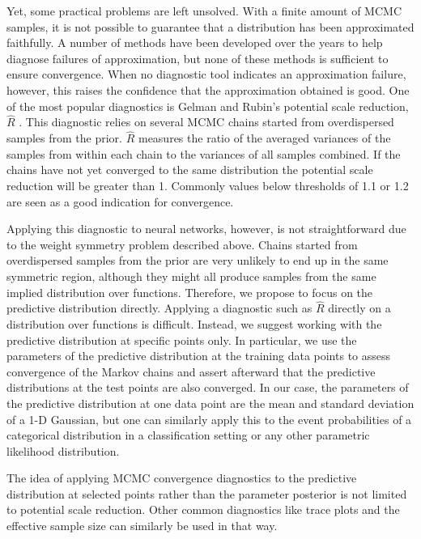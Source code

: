 \documentclass[../thesis.tex]{subfiles}
\begin{document}
Yet, some practical problems are left unsolved. With a finite amount of MCMC samples, it is not possible to guarantee that a distribution has been approximated faithfully. A number of methods have been developed over the years to help diagnose failures of approximation, but none of these methods is sufficient to ensure convergence. When no diagnostic tool indicates an approximation failure, however, this raises the confidence that the approximation obtained is good. One of the most popular diagnostics is Gelman and Rubin's potential scale reduction, $\hat{R}$ \parencite{gelman1992inference}. This diagnostic relies on several MCMC chains started from overdispersed samples from the prior. $\hat{R}$ measures the ratio of the averaged variances of the samples from within each chain to the variances of all samples combined. If the chains have not yet converged to the same distribution the potential scale reduction will be greater than 1. Commonly values below thresholds of 1.1 or 1.2 are seen as a good indication for convergence.

Applying this diagnostic to neural networks, however, is not straightforward due to the weight symmetry problem described above. Chains started from overdispersed samples from the prior are very unlikely to end up in the same symmetric region, although they might all produce samples from the same implied distribution over functions. Therefore, we propose to focus on the predictive distribution directly. Applying a diagnostic such as $\hat{R}$ directly on a distribution over functions is difficult. Instead, we suggest working with the predictive distribution at specific points only. In particular, we use the parameters of the predictive distribution at the training data points to assess convergence of the Markov chains and assert afterward that the predictive distributions at the test points are also converged. In our case, the parameters of the predictive distribution at one data point are the mean and standard deviation of a 1-D Gaussian, but one can similarly apply this to the event probabilities of a categorical distribution in a classification setting or any other parametric likelihood distribution.

The idea of applying MCMC convergence diagnostics to the predictive distribution at selected points rather than the parameter posterior is not limited to potential scale reduction. Other common diagnostics like trace plots and the effective sample size can similarly be used in that way.
\end{document}
